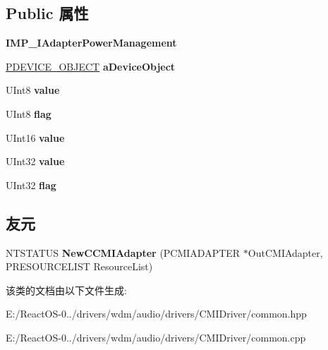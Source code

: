 \subsection*{Public 属性}
\begin{DoxyCompactItemize}
\item 
\mbox{\label{class_c_c_m_i_adapter_af6f47707add0f4d9dda7c078d8d38508}} 
{\bfseries I\+M\+P\+\_\+\+I\+Adapter\+Power\+Management}
\item 
\mbox{\label{class_c_c_m_i_adapter_a7cb24abb78da5442c236c3178aac9fd8}} 
\hyperlink{struct___d_e_v_i_c_e___o_b_j_e_c_t}{P\+D\+E\+V\+I\+C\+E\+\_\+\+O\+B\+J\+E\+CT} {\bfseries a\+Device\+Object}
\item 
\mbox{\label{class_c_c_m_i_adapter_a271f36598aa69700d823cbfa8cb0b8c7}} 
U\+Int8 {\bfseries value}
\item 
\mbox{\label{class_c_c_m_i_adapter_a507045dad29e950ee7719930a896ccf6}} 
U\+Int8 {\bfseries flag}
\item 
\mbox{\label{class_c_c_m_i_adapter_af0eb071b7f4a9b5a1c7d4929bad2dc46}} 
U\+Int16 {\bfseries value}
\item 
\mbox{\label{class_c_c_m_i_adapter_aadb1b8c7f2bbd3cf7015a40303f85af5}} 
U\+Int32 {\bfseries value}
\item 
\mbox{\label{class_c_c_m_i_adapter_ab695df4e076956defc15c69a7253dc08}} 
U\+Int32 {\bfseries flag}
\end{DoxyCompactItemize}
\subsection*{友元}
\begin{DoxyCompactItemize}
\item 
\mbox{\label{class_c_c_m_i_adapter_a22afbbe75d61683c41269057e8d184b4}} 
N\+T\+S\+T\+A\+T\+US {\bfseries New\+C\+C\+M\+I\+Adapter} (P\+C\+M\+I\+A\+D\+A\+P\+T\+ER $\ast$Out\+C\+M\+I\+Adapter, P\+R\+E\+S\+O\+U\+R\+C\+E\+L\+I\+ST Resource\+List)
\end{DoxyCompactItemize}


该类的文档由以下文件生成\+:\begin{DoxyCompactItemize}
\item 
E\+:/\+React\+O\+S-\/0../drivers/wdm/audio/drivers/\+C\+M\+I\+Driver/common.\+hpp\item 
E\+:/\+React\+O\+S-\/0../drivers/wdm/audio/drivers/\+C\+M\+I\+Driver/common.\+cpp\end{DoxyCompactItemize}
